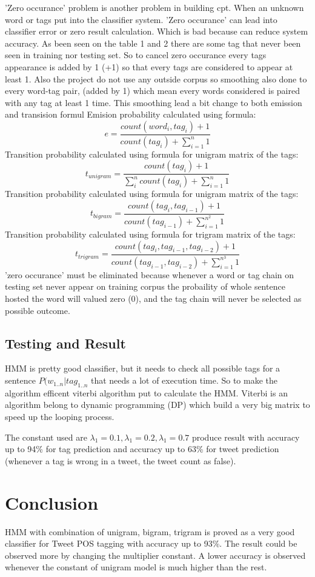 \documentclass[conference,compsoc]{IEEEtran}
\begin{document}
'Zero occurance' problem is another problem in building cpt. When an unknown word or tags put into the classifier system. 'Zero occurance' can lead into classifier error or zero result calculation. Which is bad because can reduce system accuracy. As been seen on the table 1 and 2 there are some tag that never been seen in training nor testing set. So to cancel zero occurance every tags appearance is added by 1 (+1) so that every tags are considered to appear at least 1. Also the project do not use any outside corpus so smoothing also done to every word-tag pair, (added by 1) which mean every words considered is paired with any tag at least 1 time. This smoothing lead a bit change to both emission and transision formul
Emision probability calculated using formula:
\[ e = \frac{count(word_i, tag_i)+1}{count(tag_i)+\sum_{i=1}^n 1} \]
Transition probability calculated using formula for unigram matrix of the tags:
\[ t_{unigram} = \frac{count(tag_i)+1}{\sum_i^n count(tag_i)+\sum_{i=1}^n 1} \]
Transition probability calculated using formula for unigram matrix of the tags:
\[ t_{bigram} = \frac{count(tag_i,tag_{i-1})+1}{count(tag_{i-1})+\sum_{i=1}^{n^2} 1} \]
Transition probability calculated using formula for trigram matrix of the tags:
\[ t_{trigram} = \frac{count(tag_i,tag_{i-1},tag_{i-2})+1}{count(tag_{i-1},tag_{i-2})+\sum_{i=1}^{n^3} 1} \]
'zero occurance' must be eliminated because whenever a word or tag chain on testing set never appear on training corpus the probaility  of whole sentence hosted the word will valued zero (0), and the tag chain  will never be selected as possible outcome.


\subsection{Testing and Result}
HMM is pretty good classifier, but it needs to check all possible tags for a sentence $P(w_{1..n}|tag_{1..n}$ that needs a lot of execution time. So to make the algorithm efficent viterbi algorithm put to calculate the HMM. Viterbi is an algorithm belong to dynamic programming (DP) which build a very big matrix to speed up the looping process.

The constant used are $\lambda_1 = 0.1, \lambda_1 = 0.2, \lambda_1 = 0.7$ produce result with accuracy up to 94\% for tag prediction and accuracy up to 63\% for tweet prediction (whenever a tag is wrong in a tweet, the tweet count as false).


\section{Conclusion}
HMM with combination of unigram, bigram, trigram is proved as a very good classifier for Tweet POS tagging with accuracy up to 93\%. The result could be observed more by changing the multiplier constant. A lower accuracy is observed whenever the constant of unigram model is much higher than the rest.
\end{document}

